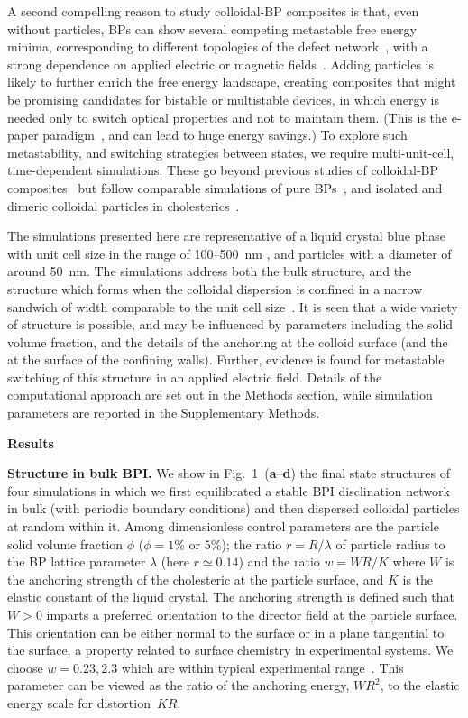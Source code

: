 \documentclass[12pt]{article}
\begin{document}
A second compelling reason to study colloidal-BP composites is that, even without particles, BPs can show several competing metastable free energy minima,
corresponding to different topologies of the defect network~\cite{adriano,fukuda}, with a strong dependence on applied electric or magnetic fields~\cite{henrichfield}.
% 
Adding particles is likely to further enrich the free energy landscape, creating composites that might be promising candidates for bistable or multistable devices, in which energy is needed only to switch optical properties and not to maintain them. (This is the e-paper paradigm~\cite{epaper}, and can lead to huge energy savings.)
To explore such metastability, and switching strategies between states, we require multi-unit-cell, time-dependent simulations. These go beyond previous studies of colloidal-BP composites~\cite{miha} but follow comparable simulations of pure BPs~\cite{bp3,henrichfield,domaingrowth}, and isolated and dimeric colloidal particles in cholesterics~\cite{juho1,juho2}.


The simulations presented here are representative of a liquid crystal
blue phase with unit cell size in the range of 100--500~nm \cite{mermin},
and particles with a diameter of around 50~nm. The simulations
address both the bulk structure, and the structure which forms when
the colloidal dispersion is confined in a narrow sandwich of width
comparable to the unit cell size~\cite{extrareference2}. It is seen
that a wide variety of structure is possible, and may be influenced
by parameters including the solid volume fraction, and the details
of the anchoring at the colloid surface (and the at the surface of the
confining walls). Further, evidence is found for metastable switching of
this structure in an applied electric field. Details of the
computational approach are set out in the Methods section, while
simulation parameters are reported in the Supplementary Methods.


\bigskip
\noindent
\textbf{\large Results}

\noindent
\textbf{Structure in bulk BPI.}
We show in Fig.~1~(\textbf{a}--\textbf{d})
the final state structures of four simulations in which we first equilibrated a stable BPI disclination network in bulk (with periodic boundary conditions) and then dispersed colloidal particles at random within it. Among dimensionless control parameters are the particle solid volume fraction $\phi$  ($\phi = 1\%$ or $5\%$); the ratio $r = R/\lambda$ of particle radius to the BP lattice parameter $\lambda$ (here $r\simeq 0.14$) and the ratio $w = WR/K$ where $W$ is the anchoring strength of the cholesteric at the particle surface, and $K$ is the elastic constant of the liquid crystal.
The anchoring strength is defined such that $W > 0$ imparts a preferred
orientation to the director field at the particle surface. This orientation
can be either normal to the surface or in a plane tangential to the surface,
a property related to surface chemistry in experimental systems.
We choose $w = 0.23, 2.3$ which are within typical experimental range~\cite{tiffany}. This parameter can be viewed as the ratio of the anchoring energy, $WR^2$, to the elastic energy scale for distortion~$KR$. 
\end{document}
